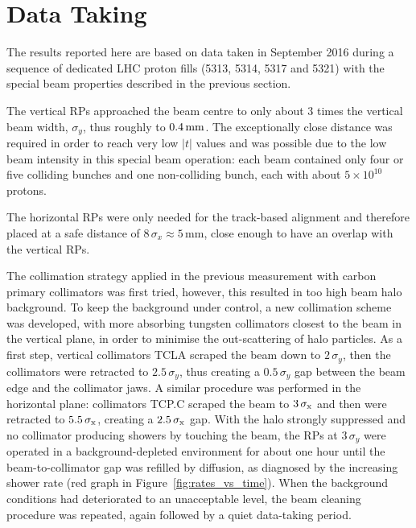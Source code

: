 \section{Data Taking}
\label{sec:data taking}

The results reported here are based on data taken in September 2016 during a sequence of dedicated LHC proton fills (5313, 5314, 5317 and 5321) with the special beam properties described in the previous section.



The vertical RPs approached the beam centre to only about 3 times the vertical beam width, $\sigma_{y}$, thus roughly to $0.4\,{\rm mm}$. The exceptionally close distance was required in order to reach very low $|t|$ values and was possible due to the low beam intensity in this special beam operation: each beam contained only four or five colliding bunches and one non-colliding bunch, each with about $5\times 10^{10}$ protons.

The horizontal RPs were only needed for the track-based alignment and therefore placed at a safe distance of $8\,\sigma_{x} \approx 5$\,mm, close enough to have an overlap with the vertical RPs.

The collimation strategy applied in the previous measurement \cite{totem-8tev-1km} with carbon primary collimators was first tried, however, this resulted in too high beam halo background. To keep the background under control, a new collimation scheme was developed, with more absorbing tungsten collimators closest to the beam in the vertical plane, in order to minimise the out-scattering of halo particles. As a first step, vertical collimators TCLA scraped the beam down to $2\,\sigma_{y}$, then the collimators were retracted to $2.5\,\sigma_{y}$, thus creating a $0.5\,\sigma_{y}$ gap between the beam edge and the collimator jaws. A similar procedure was performed in the horizontal plane: collimators TCP.C scraped the beam to $3\,{\rm \sigma_{x}}$ and then were retracted to $5.5\,{\rm \sigma_{x}}$, creating a $2.5\,{\rm \sigma_x}$ gap. With the halo strongly suppressed and no collimator producing showers by touching the beam, the RPs at $3\,\sigma_{y}$ were operated in a background-depleted environment for about one hour until the beam-to-collimator gap was refilled by diffusion, as diagnosed by the increasing shower rate (red graph in Figure~\ref{fig:rates_vs_time}). When the background conditions had deteriorated to an unacceptable level, the beam cleaning procedure was repeated, again followed by a quiet data-taking period.

